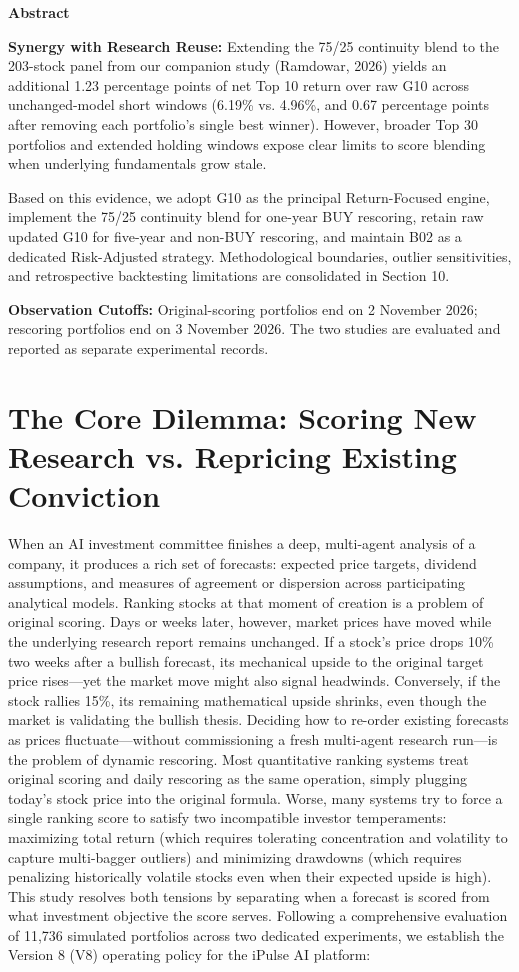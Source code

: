\documentclass[11pt,a4paper]{article}
\numberwithin{table}{section}
\renewenvironment{abstract}{\small\noindent\textbf{Abstract}\par\medskip}{\par}
\begin{document}
\begin{abstract}
\textbf{Synergy with Research Reuse:}  Extending the 75/25 continuity blend to the 203-stock panel from our companion study (Ramdowar, 2026) yields an additional 1.23 percentage points of net Top 10 return over raw G10 across unchanged-model short windows (6.19\% vs. 4.96\%, and 0.67 percentage points after removing each portfolio's single best winner). However, broader Top 30 portfolios and extended holding windows expose clear limits to score blending when underlying fundamentals grow stale.

Based on this evidence, we adopt G10 as the principal Return-Focused engine, implement the 75/25 continuity blend for one-year BUY rescoring, retain raw updated G10 for five-year and non-BUY rescoring, and maintain B02 as a dedicated Risk-Adjusted strategy. Methodological boundaries, outlier sensitivities, and retrospective backtesting limitations are consolidated in Section 10.

\textbf{Observation Cutoffs:}  Original-scoring portfolios end on 2 November 2026; rescoring portfolios end on 3 November 2026. The two studies are evaluated and reported as separate experimental records.

\end{abstract}
\clearpage
\tableofcontents
\clearpage
\section{The Core Dilemma: Scoring New Research vs. Repricing Existing Conviction}

When an AI investment committee finishes a deep, multi-agent analysis of a company, it produces a rich set of forecasts: expected price targets, dividend assumptions, and measures of agreement or dispersion across participating analytical models. Ranking stocks at that moment of creation is a problem of original scoring. Days or weeks later, however, market prices have moved while the underlying research report remains unchanged. If a stock's price drops 10\% two weeks after a bullish forecast, its mechanical upside to the original target price rises---yet the market move might also signal headwinds. Conversely, if the stock rallies 15\%, its remaining mathematical upside shrinks, even though the market is validating the bullish thesis. Deciding how to re-order existing forecasts as prices fluctuate---without commissioning a fresh multi-agent research run---is the problem of dynamic rescoring. Most quantitative ranking systems treat original scoring and daily rescoring as the same operation, simply plugging today's stock price into the original formula. Worse, many systems try to force a single ranking score to satisfy two incompatible investor temperaments: maximizing total return (which requires tolerating concentration and volatility to capture multi-bagger outliers) and minimizing drawdowns (which requires penalizing historically volatile stocks even when their expected upside is high). This study resolves both tensions by separating when a forecast is scored from what investment objective the score serves. Following a comprehensive evaluation of 11,736 simulated portfolios across two dedicated experiments, we establish the Version 8 (V8) operating policy for the iPulse AI platform:
\end{document}
